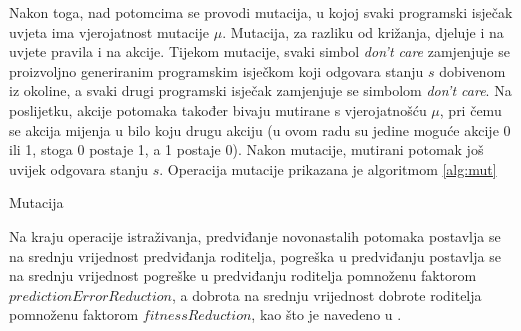 \documentclass[times, utf8, zavrsni]{fer}
\begin{document}
Nakon toga, nad potomcima se provodi mutacija, u kojoj svaki programski isječak uvjeta ima vjerojatnost mutacije $\mu$.
Mutacija, za razliku od križanja, djeluje i na uvjete pravila i na akcije.
Tijekom mutacije, svaki simbol \emph{don't care} zamjenjuje se proizvoljno generiranim programskim isječkom koji odgovara stanju $s$ dobivenom iz okoline, a svaki drugi programski isječak zamjenjuje se simbolom \emph{don't care}.
Na poslijetku, akcije potomaka također bivaju mutirane s vjerojatnošću $\mu$, pri čemu se akcija mijenja u bilo koju drugu akciju (u ovom radu su jedine moguće akcije 0 ili 1, stoga 0 postaje 1, a 1 postaje 0).
Nakon mutacije, mutirani potomak još uvijek odgovara stanju $s$.
Operacija mutacije prikazana je algoritmom \ref{alg:mut}
\begin{algorithm}[h]
    \caption{Mutacija}
    \label{alg:mut}
    \begin{algorithmic}
        \STATE{$r :=$ proizvoljan decimalni broj iz intervala [0, 1)}
        \REPEAT
        \ELSE
        \ENDIF
        \ENDIF
        \ENDFOR
        \STATE{$r :=$ proizvoljan decimalni broj iz intervala [0, 1)}
        \ENDIF
    \end{algorithmic}
\end{algorithm}

Na kraju operacije istraživanja, predviđanje novonastalih potomaka postavlja se na srednju vrijednost predviđanja roditelja, pogreška u predviđanju postavlja se na srednju vrijednost pogreške u predviđanju roditelja pomnoženu faktorom $predictionErrorReduction$, a dobrota na srednju vrijednost dobrote roditelja pomnoženu faktorom $fitnessReduction$, kao što je navedeno u \citep{4}.
\end{document}
